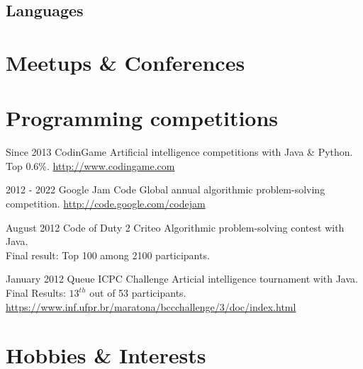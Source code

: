 \documentclass[11pt,a4paper,sans]{moderncv}
\begin{document}
\subsection{Languages}\label{subsec:languages}


\section{Meetups \& Conferences}\label{sec:meetups-&-conferences}

\section{Programming competitions}\label{sec:programming-competitions}

\cventry
{Since 2013}
{CodinGame}
{Artificial intelligence competitions with Java \& Python. Top 0.6\%.}
{}
{}
{\url{http://www.codingame.com}}

\cventry
{2012 - 2022}
{Google Jam Code}
{Global annual algorithmic problem-solving competition.}
{}
{}
{\url{http://code.google.com/codejam}}

\cventry
{August 2012}
{Code of Duty 2}
{Criteo}
{}
{}
{Algorithmic problem-solving contest with Java.\\Final result: Top 100 among 2100 participants.}

\cventry
{January 2012}
{Queue ICPC Challenge}
{}
{}
{}
{Articial intelligence tournament with Java.\\Final Results: $13^{th}$ out of 53 participants.\\\url{https://www.inf.ufpr.br/maratona/bccchallenge/3/doc/index.html}}

\section{Hobbies \& Interests}\label{sec:hobbies-&-interests}

\end{document}

